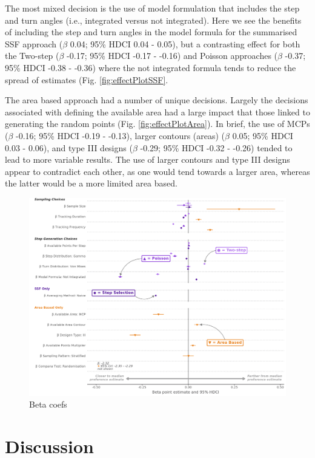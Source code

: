 \documentclass[10pt,a4paper]{article}
\begin{document}
The most mixed decision is the use of model formulation that includes the step and turn angles (i.e., integrated versus not integrated).
Here we see the benefits of including the step and turn angles in the model formula for the summarised SSF approach (\(\beta\) 0.04; 95\% HDCI 0.04 - 0.05), but a contrasting effect for both the Two-step (\(\beta\) -0.17; 95\% HDCI -0.17 - -0.16) and Poisson approaches (\(\beta\) -0.37; 95\% HDCI -0.38 - -0.36) where the not integrated formula tends to reduce the spread of estimates (Fig. \ref{fig:effectPlotSSF}.

The area based approach had a number of unique decisions.
Largely the decisions associated with defining the available area had a large impact that those linked to generating the random points (Fig. \ref{fig:effectPlotArea}).
In brief, the use of MCPs (\(\beta\) -0.16; 95\% HDCI -0.19 - -0.13), larger contours (areas) (\(\beta\) 0.05; 95\% HDCI 0.03 - 0.06), and type III designs (\(\beta\) -0.29; 95\% HDCI -0.32 - -0.26) tended to lead to more variable results.
The use of larger contours and type III designs appear to contradict each other, as one would tend towards a larger area, whereas the latter would be a more limited area based.

\begin{figure}
\includegraphics[width=1\linewidth]{../figures/_allEffectsPlot} \caption{Beta coefs}\label{fig:allEffectsPlot}
\end{figure}

\section{Discussion}\label{discussion}
\end{document}
